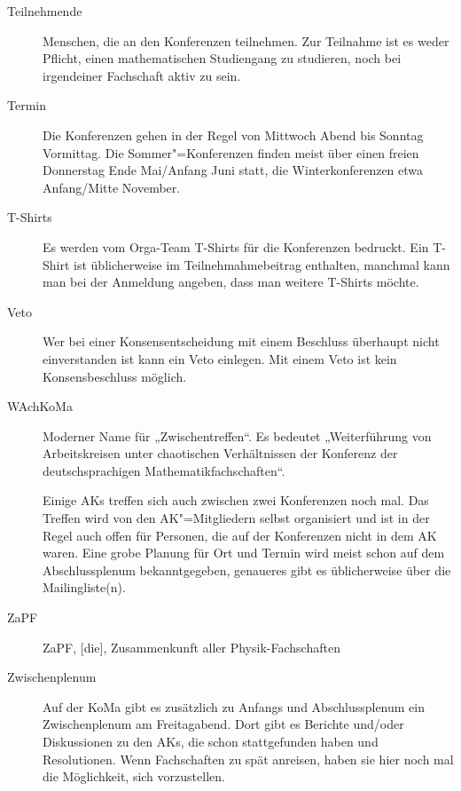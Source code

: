 \begin{description}
\item[Teilnehmende]
    Menschen, die an den Konferenzen teilnehmen. Zur Teilnahme ist es weder Pflicht, einen mathematischen Studiengang zu studieren, noch bei irgendeiner Fachschaft aktiv zu sein.

\item[Termin]
    Die Konferenzen gehen in der Regel von Mittwoch Abend bis Sonntag Vormittag. Die Sommer"=Konferenzen finden meist über einen freien Donnerstag Ende Mai/Anfang Juni statt, die Winterkonferenzen etwa Anfang/Mitte November.

\item[T-Shirts]
    Es werden vom Orga-Team T-Shirts für die Konferenzen bedruckt. Ein T-Shirt ist üblicherweise im Teilnehmahmebeitrag enthalten, manchmal kann man bei der Anmeldung angeben, dass man weitere T-Shirts möchte.

\item[Veto]
    Wer bei einer Konsensentscheidung mit einem Beschluss überhaupt nicht einverstanden ist kann ein Veto einlegen. Mit einem Veto ist kein Konsensbeschluss möglich.

\item[WAchKoMa]
    Moderner Name für „Zwischentreffen“. Es bedeutet „Weiterführung	von Arbeitskreisen unter chaotischen Verhältnissen der Konferenz der deutschsprachigen Mathematikfachschaften“. 
    
    Einige AKs treffen sich auch zwischen zwei Konferenzen noch mal. Das Treffen wird von den AK"=Mitgliedern selbst organisiert und ist in der Regel auch offen für Personen, die auf der Konferenzen nicht in dem AK waren.  Eine grobe Planung für Ort und Termin wird meist schon auf dem Abschlussplenum bekanntgegeben, genaueres gibt es üblicherweise über die Mailingliste(n).

\item[ZaPF]
    ZaPF, [die], Zusammenkunft aller Physik-Fachschaften

\item[Zwischenplenum]
    Auf der KoMa gibt es zusätzlich zu Anfangs und Abschlussplenum ein Zwischenplenum am Freitagabend.  Dort gibt es Berichte und/oder Diskussionen zu den AKs, die schon stattgefunden haben und Resolutionen. Wenn Fachschaften zu spät anreisen, haben sie hier noch mal die Möglichkeit, sich vorzustellen.
\end{description}
